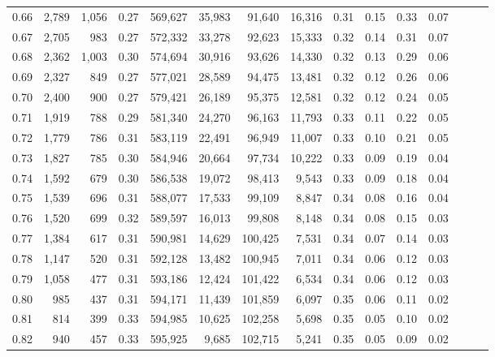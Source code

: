 \begin{tabular}{rrrrrrrrrrrrrrr}
0.66 &   2,789 &  1,056 &  0.27 &  569,627 &   35,983 &   91,640 &   16,316 &  0.31 &  0.15 &  0.33 &      0.07 \\
0.67 &   2,705 &    983 &  0.27 &  572,332 &   33,278 &   92,623 &   15,333 &  0.32 &  0.14 &  0.31 &      0.07 \\
0.68 &   2,362 &  1,003 &  0.30 &  574,694 &   30,916 &   93,626 &   14,330 &  0.32 &  0.13 &  0.29 &      0.06 \\
0.69 &   2,327 &    849 &  0.27 &  577,021 &   28,589 &   94,475 &   13,481 &  0.32 &  0.12 &  0.26 &      0.06 \\
0.70 &   2,400 &    900 &  0.27 &  579,421 &   26,189 &   95,375 &   12,581 &  0.32 &  0.12 &  0.24 &      0.05 \\
0.71 &   1,919 &    788 &  0.29 &  581,340 &   24,270 &   96,163 &   11,793 &  0.33 &  0.11 &  0.22 &      0.05 \\
0.72 &   1,779 &    786 &  0.31 &  583,119 &   22,491 &   96,949 &   11,007 &  0.33 &  0.10 &  0.21 &      0.05 \\
0.73 &   1,827 &    785 &  0.30 &  584,946 &   20,664 &   97,734 &   10,222 &  0.33 &  0.09 &  0.19 &      0.04 \\
0.74 &   1,592 &    679 &  0.30 &  586,538 &   19,072 &   98,413 &    9,543 &  0.33 &  0.09 &  0.18 &      0.04 \\
0.75 &   1,539 &    696 &  0.31 &  588,077 &   17,533 &   99,109 &    8,847 &  0.34 &  0.08 &  0.16 &      0.04 \\
0.76 &   1,520 &    699 &  0.32 &  589,597 &   16,013 &   99,808 &    8,148 &  0.34 &  0.08 &  0.15 &      0.03 \\
0.77 &   1,384 &    617 &  0.31 &  590,981 &   14,629 &  100,425 &    7,531 &  0.34 &  0.07 &  0.14 &      0.03 \\
0.78 &   1,147 &    520 &  0.31 &  592,128 &   13,482 &  100,945 &    7,011 &  0.34 &  0.06 &  0.12 &      0.03 \\
0.79 &   1,058 &    477 &  0.31 &  593,186 &   12,424 &  101,422 &    6,534 &  0.34 &  0.06 &  0.12 &      0.03 \\
0.80 &     985 &    437 &  0.31 &  594,171 &   11,439 &  101,859 &    6,097 &  0.35 &  0.06 &  0.11 &      0.02 \\
0.81 &     814 &    399 &  0.33 &  594,985 &   10,625 &  102,258 &    5,698 &  0.35 &  0.05 &  0.10 &      0.02 \\
0.82 &     940 &    457 &  0.33 &  595,925 &    9,685 &  102,715 &    5,241 &  0.35 &  0.05 &  0.09 &      0.02 \\

\end{tabular}
